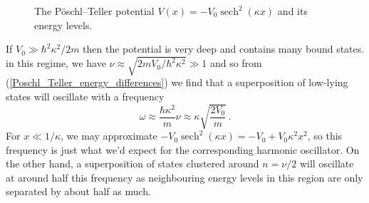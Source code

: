 \documentclass{article}
\theoremstyle{plain}\theoremheaderfont{\normalfont\itshape}\theorembodyfont{\rmfamily}\theoremseparator{.}\newtheorem*{rem}{Remark}\newtheorem*{ex}{Example}\newtheorem*{proof}{Proof}\newtheorem*{altp}{Alternative proof}
\theoremstyle{plain}\theoremheaderfont{\normalfont\bfseries}\theorembodyfont{\rmfamily}\theoremseparator{.}\newtheorem{thm}{Theorem}[section]\newtheorem{lem}[thm]{Lemma}\newtheorem{prop}[thm]{Proposition}\newtheorem*{cor}{Corollary}\newtheorem{defn}[thm]{Definition}\newtheorem{clm}[thm]{Claim}\newtheorem{clminproof}{Claim}
\theoremstyle{break}\theoremheaderfont{\normalfont\itshape}\theorembodyfont{\rmfamily}\theoremseparator{.\medskip}\newtheorem*{proofskip}{Proof}\newtheorem*{exs}{Examples}\newtheorem*{rems}{Remarks}
\theoremstyle{break}\theoremheaderfont{\normalfont\bfseries}\theorembodyfont{\rmfamily}\theoremseparator{.\medskip}\newtheorem{lemskip}[thm]{Lemma}\newtheorem{defnskip}[thm]{Definition}\newtheorem{propskip}[thm]{Proposition}\newtheorem{thmskip}[thm]{Theorem}
\numberwithin{equation}{section}
\DeclareMathOperator{\sech}{sech}
\begin{document}
    \begin{figure}
        \centering
        \caption{The P\"{o}schl--Teller potential \(V(x)=-V_0\sech^2(\kappa x)\) and its energy levels. }
    \end{figure}

    If \(V_0\gg\hbar^2\kappa^2/2m\) then the potential is very deep and contains many bound states. in this regime, we have \(\nu\approx\sqrt{2mV_0/\hbar^2\kappa^2}\gg 1\) and so from (\ref{Poschl_Teller_energy_differences}) we find that a superposition of low-lying states will oscillate with a frequency
    \begin{equation}
        \omega\approx\frac{\hbar\kappa^2}{m}\nu\approx\kappa\sqrt{\frac{2V_0}{m}}\,.
    \end{equation}
    For \(x\ll 1/\kappa\), we may approximate \(-V_0\sech^2(\kappa x)=-V_0+V_0\kappa^2 x^2\), so this frequency is just what we'd expect for the corresponding harmonic oscillator. On the other hand, a superposition of states clustered around \(n=\nu/2\) will oscillate at around half this frequency as neighbouring energy levels in this region are only separated by about half as much.
\end{document}
